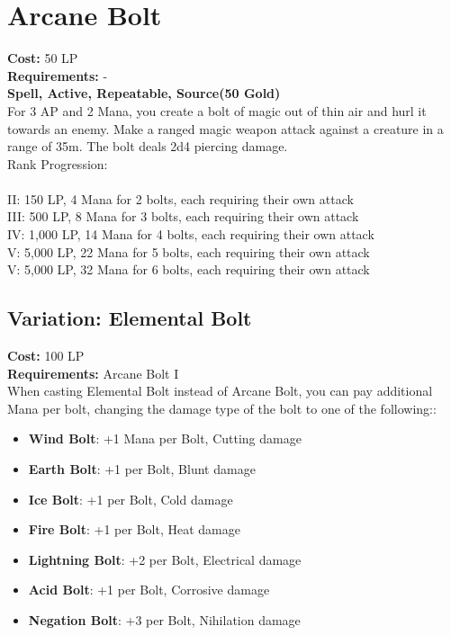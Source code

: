 \section{Arcane Bolt}\label{spell:arcaneBolt}
\textbf{Cost:} 50 LP\\
\textbf{Requirements:} -\\
\textbf{Spell, Active, Repeatable, Source(50 Gold)}\\
For 3 AP and 2 Mana, you create a bolt of magic out of thin air and hurl it towards an enemy.
Make a ranged magic weapon attack against a creature in a range of 35m.
The bolt deals 2d4 piercing damage.
\\
Rank Progression:\\
\\
II: 150 LP, 4 Mana for 2 bolts, each requiring their own attack\\
III: 500 LP, 8 Mana for 3 bolts, each requiring their own attack\\
IV: 1,000 LP, 14 Mana for 4 bolts, each requiring their own attack\\
V: 5,000 LP, 22 Mana for 5 bolts, each requiring their own attack\\
V: 5,000 LP, 32 Mana for 6 bolts, each requiring their own attack\\

\subsection{Variation: Elemental Bolt}\label{spell:elementalBolt}
\textbf{Cost:} 100 LP\\
\textbf{Requirements:} Arcane Bolt I\\
When casting Elemental Bolt instead of Arcane Bolt, you can pay additional Mana per bolt, changing the damage type of the bolt to one of the following::\\
\begin{itemize}
    \item \textbf{Wind Bolt}: +1 Mana per Bolt, Cutting damage
    \item \textbf{Earth Bolt}: +1 per Bolt, Blunt damage
    \item \textbf{Ice Bolt}: +1 per Bolt, Cold damage
    \item \textbf{Fire Bolt}: +1 per Bolt, Heat damage
    \item \textbf{Lightning Bolt}: +2 per Bolt, Electrical damage
    \item \textbf{Acid Bolt}: +1 per Bolt, Corrosive damage
    \item \textbf{Negation Bolt}: +3 per Bolt, Nihilation damage
\end{itemize}
